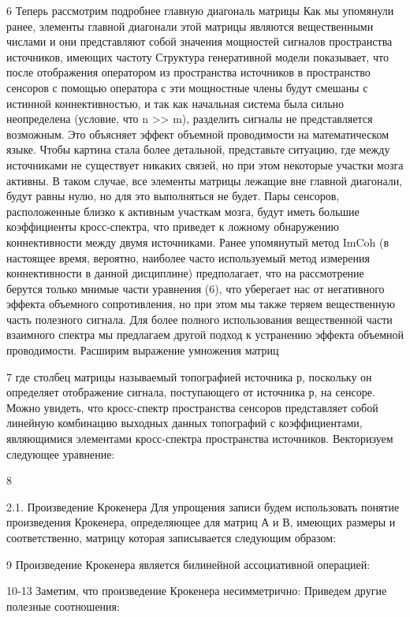6
Теперь рассмотрим подробнее главную диагональ матрицы Как мы упомянули ранее, элементы главной диагонали этой матрицы являются вещественными числами и они представляют собой значения мощностей сигналов пространства источников, имеющих частоту Структура генеративной модели показывает, что после отображения оператором из пространства источников в пространство сенсоров с помощью оператора с эти мощностные члены будут смешаны с истинной коннективностью, и так как начальная система была сильно неопределена (условие, что n >> m), разделить сигналы не представляется возможным. Это объясняет эффект объемной проводимости на математическом языке. 
Чтобы картина стала более детальной, представьте ситуацию, где между источниками не существует никаких связей, но при этом некоторые участки мозга активны. В таком случае, все элементы матрицы лежащие вне главной диагонали, будут равны нулю, но для это выполняться не будет. Пары сенсоров, расположенные близко к активным участкам мозга, будут иметь большие коэффициенты кросс-спектра, что приведет к ложному обнаружению коннективности между двумя источниками.
Ранее упомянутый метод ImCoh (в настоящее время, вероятно, наиболее часто используемый метод измерения коннективности в данной дисциплине) предполагает, что на рассмотрение берутся только мнимые части уравнения (6), что уберегает нас от негативного эффекта объемного сопротивления, но при этом мы также теряем вещественную часть полезного сигнала.
Для более полного использования вещественной части взаимного спектра мы предлагаем другой подход к устранению эффекта объемной проводимости. Расширим выражение умножения матриц 

7
где столбец матрицы называемый топографией источника р, поскольку он определяет отображение сигнала, поступающего от источника р, на сенсоре. Можно увидеть, что кросс-спектр пространства сенсоров представляет собой линейную комбинацию выходных данных топографий с коэффициентами, являющимися элементами кросс-спектра пространства источников. Векторизуем следующее уравнение:

8

2.1. Произведение Крокенера
Для упрощения записи будем использовать понятие произведения Крокенера, определяющее для матриц А и В, имеющих размеры и соответственно, матрицу которая записывается следующим образом: 

9
Произведение Крокенера является билинейной ассоциативной операцией:

10-13
Заметим, что произведение Крокенера несимметрично: Приведем другие полезные соотношения:

